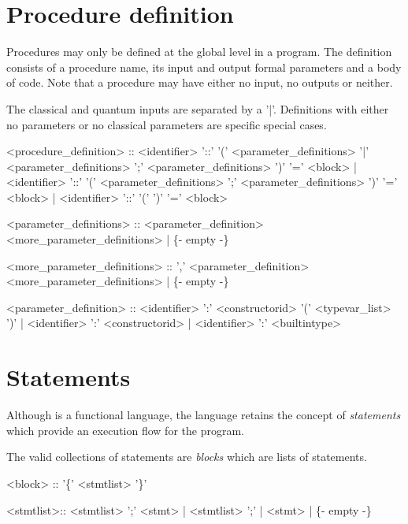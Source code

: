\section{Procedure definition}\label{sec:bnfProcedureDefinition}
Procedures may only be defined at  the global level
in a \lqpl{} program. The definition consists of
a procedure name, its input and output formal parameters and
a body of code. Note that a procedure may have either no input, no
outputs or neither.

The classical and quantum inputs are  separated by a '|'. 
Definitions with either no parameters or no classical parameters are
specific special cases. 

\begin{singlespace}
\begin{bnf}
   <procedure_definition> :: <identifier> '::' 
            '(' <parameter_definitions> '|' 
	        <parameter_definitions> ';' 	
                <parameter_definitions>  ')'
                    '='  <block>
        | <identifier> '::' 
            '(' <parameter_definitions> ';' 	
                <parameter_definitions>  ')'
                    '='  <block>
        | <identifier> '::' '(' ')' '=' <block>
  
   <parameter_definitions> :: <parameter_definition>
             <more_parameter_definitions>
        | \{- empty -\}
  
   <more_parameter_definitions> :: ',' <parameter_definition> 
	     <more_parameter_definitions>
        | \{- empty -\}
  
   <parameter_definition> :: <identifier> ':' <constructorid>
             '(' <typevar_list> ')' 
        | <identifier> ':' <constructorid>
        | <identifier> ':' <builtintype>
     
\end{bnf}
\end{singlespace}

\section{Statements}\label{sec:bnfStatementDefinition}
Although \lqpl{} is a functional  language, the language retains the
concept of \emph{statements} which provide an execution flow for the
program. 

The valid collections of statements are \emph{blocks} which
are lists of statements.

\begin{singlespace}
\begin{bnf}   

   <block> :: '\{' <stmtlist> '\}' 
  
   <stmtlist>:: <stmtlist> ';' <stmt>
        | <stmtlist> ';'
        | <stmt>
        | \{- empty -\}
     
\end{bnf}
\end{singlespace}

